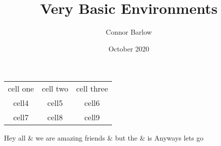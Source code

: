 \documentclass{article}
\title{Very Basic Environments}
\author{Connor Barlow}
\date{October 2020}
\begin{document}
\maketitle
\begin{center}
\begin{tabular}{ c c c }
 cell one & cell two & cell three \\ 
 cell4 & cell5 & cell6 \\  
 cell7 & cell8 & cell9    
\end{tabular}
\end{center}

Hey all & we are amazing friends \& but the & is
Anyways lets go
\end{document}
